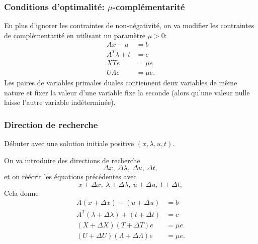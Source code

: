 \documentclass[t,usepdftitle=false]{beamer}
\begin{document}
\begin{frame}
\frametitle{Conditions d'optimalité: $\mu$-complémentarité}

En plus d'ignorer les contraintes de non-négativité, on va modifier les contraintes de complémentarité en utilisant un paramètre $\mu > 0$:
\begin{align*}
Ax - u &= b \\
A^T \lambda + t &= c \\
XTe &= \mu e\\
U\Lambda e &= \mu e.
\end{align*}
Les paires de variables primales duales contiennent deux variables de même nature et fixer la valeur d'une variable fixe la seconde (alors qu'une valeur nulle laisse l'autre variable indéterminée).

\end{frame}

\begin{frame}
\frametitle{Direction de recherche}

Débuter avec une solution initiale positive $(x, \lambda, u, t)$.

\mbox{}

On va introduire des directions de recherche
\[
\Delta x,\ \Delta \lambda,\ \Delta u,\ \Delta t,
\]
et on réécrit les équations précédentes avec
\[
x + \Delta x,\ \lambda + \Delta \lambda,\ u + \Delta u,\ t + \Delta t,
\]
Cela donne
\begin{align*}
A(x + \Delta x) - (u + \Delta u) &= b \\
A^T (\lambda + \Delta \lambda) + (t + \Delta t) &= c \\
(X + \Delta X)(T + \Delta T)e &= \mu e\\
(U + \Delta U)(\Lambda + \Delta \Lambda)e &= \mu e.
\end{align*}

\end{frame}
\end{document}
